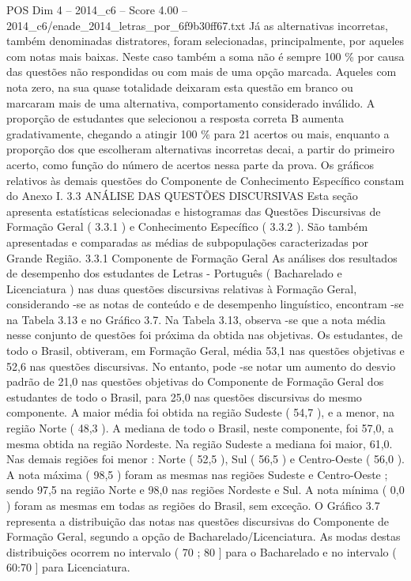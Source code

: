 \begin{textsample}{POS Dim 4 – 2014\_c6 – Score 4.00 – 2014\_c6/enade\_2014\_letras\_por\_6f9b30ff67.txt}
Já as alternativas incorretas, também denominadas distratores, foram selecionadas, principalmente, por aqueles com notas mais baixas.
Neste caso também a soma não é sempre 100 \% por causa das questões não respondidas ou com mais de uma opção marcada.
Aqueles com nota zero, na sua quase totalidade deixaram esta questão em branco ou marcaram mais de uma alternativa, comportamento considerado inválido.
A proporção de estudantes que selecionou a resposta correta B aumenta gradativamente, chegando a atingir 100 \% para 21 acertos ou mais, enquanto a proporção dos que escolheram alternativas incorretas decai, a partir do primeiro acerto, como função do número de acertos nessa parte da prova.
Os gráficos relativos às demais questões do Componente de Conhecimento Específico constam do Anexo I. 3.3 ANÁLISE DAS QUESTÕES DISCURSIVAS Esta seção apresenta estatísticas selecionadas e histogramas das Questões Discursivas de Formação Geral ( 3.3.1 ) e Conhecimento Específico ( 3.3.2 ).
São também apresentadas e comparadas as médias de subpopulações caracterizadas por Grande Região. 3.3.1 Componente de Formação Geral As análises dos resultados de desempenho dos estudantes de Letras - Português ( Bacharelado e Licenciatura ) nas duas questões discursivas relativas à Formação Geral, considerando -se as notas de conteúdo e de desempenho linguístico, encontram -se na Tabela 3.13 e no Gráfico 3.7.
Na Tabela 3.13, observa -se que a nota média nesse conjunto de questões foi próxima da obtida nas objetivas.
Os estudantes, de todo o Brasil, obtiveram, em Formação Geral, média 53,1 nas questões objetivas e 52,6 nas questões discursivas.
No entanto, pode -se notar um aumento do desvio padrão de 21,0 nas questões objetivas do Componente de Formação Geral dos estudantes de todo o Brasil, para 25,0 nas questões discursivas do mesmo componente.
A maior média foi obtida na região Sudeste ( 54,7 ), e a menor, na região Norte ( 48,3 ).
A mediana de todo o Brasil, neste componente, foi 57,0, a mesma obtida na região Nordeste.
Na região Sudeste a mediana foi maior, 61,0.
Nas demais regiões foi menor : Norte ( 52,5 ), Sul ( 56,5 ) e Centro-Oeste ( 56,0 ).
A nota máxima ( 98,5 ) foram as mesmas nas regiões Sudeste e Centro-Oeste ; sendo 97,5 na região Norte e 98,0 nas regiões Nordeste e Sul.
A nota mínima ( 0,0 ) foram as mesmas em todas as regiões do Brasil, sem exceção.
O Gráfico 3.7 representa a distribuição das notas nas questões discursivas do Componente de Formação Geral, segundo a opção de Bacharelado/Licenciatura.
As modas destas distribuições ocorrem no intervalo ( 70 ; 80 ] para o Bacharelado e no intervalo ( 60:70 ] para Licenciatura.

\end{textsample}
